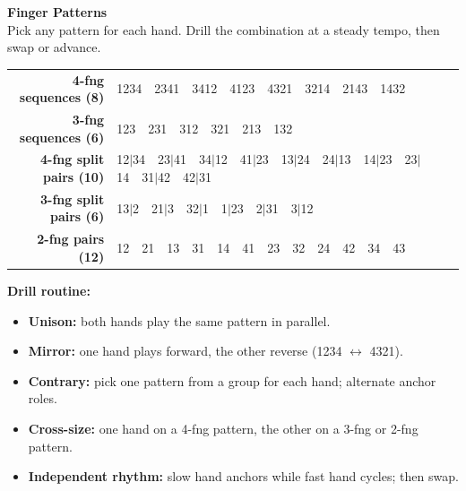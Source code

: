 \documentclass[letterpaper]{article}
\begin{document}
\begin{center}
{\fontsize{20}{24}\selectfont\textbf{Finger Patterns}}\\
\fontsize{11}{14}\selectfont
Pick any pattern for each hand. Drill the combination at a steady tempo, then swap or advance.
\end{center}

\vspace{3mm}
\fontsize{14}{17}\selectfont

\begin{tabular}{@{}r@{\hspace{6mm}}l@{}}
\rowcolor{headerbg}\color{white}\textbf{4-fng sequences (8)} &
\color{white}1234\ \ 2341\ \ 3412\ \ 4123\ \ 4321\ \ 3214\ \ 2143\ \ 1432 \\[1mm]
\rowcolor{altrow}\textbf{3-fng sequences (6)} &
123\ \ 231\ \ 312\ \ 321\ \ 213\ \ 132 \\[1mm]
\rowcolor{headerbg}\color{white}\textbf{4-fng split pairs (10)} &
\color{white}12\(\vert\)34\ \ 23\(\vert\)41\ \ 34\(\vert\)12\ \ 41\(\vert\)23\ \ 13\(\vert\)24\ \ 24\(\vert\)13\ \ 14\(\vert\)23\ \ 23\(\vert\)14\ \ 31\(\vert\)42\ \ 42\(\vert\)31 \\[1mm]
\rowcolor{altrow}\textbf{3-fng split pairs (6)} &
13\(\vert\)2\ \ 21\(\vert\)3\ \ 32\(\vert\)1\ \ 1\(\vert\)23\ \ 2\(\vert\)31\ \ 3\(\vert\)12 \\[1mm]
\rowcolor{headerbg}\color{white}\textbf{2-fng pairs (12)} &
\color{white}12\ \ 21\ \ 13\ \ 31\ \ 14\ \ 41\ \ 23\ \ 32\ \ 24\ \ 42\ \ 34\ \ 43 \\
\end{tabular}

\vspace{6mm}
\fontsize{12}{15}\selectfont
\textbf{Drill routine:}
\begin{itemize}\setlength{\itemsep}{1mm}
\item \textbf{Unison:} both hands play the same pattern in parallel.
\item \textbf{Mirror:} one hand plays forward, the other reverse (1234 \(\leftrightarrow\) 4321).
\item \textbf{Contrary:} pick one pattern from a group for each hand; alternate anchor roles.
\item \textbf{Cross-size:} one hand on a 4-fng pattern, the other on a 3-fng or 2-fng pattern.
\item \textbf{Independent rhythm:} slow hand anchors while fast hand cycles; then swap.
\end{itemize}
\end{document}

